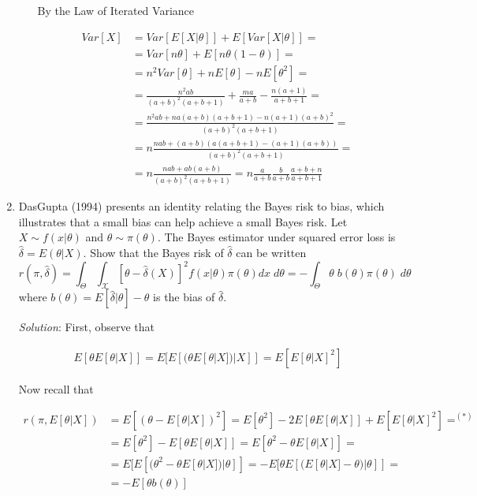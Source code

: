 \documentclass[11pt]{article}
\begin{document}
\begin{enumerate}
\begin{enumerate}
By the Law of Iterated Variance

\begin{align*}
Var[X]	&= Var[E[X|\theta]] + E[Var[X|\theta]] = \\
				&= Var[n\theta] + E[n\theta(1-\theta)] = \\
				&= n^{2}Var[\theta] + nE[\theta] - nE[\theta^{2}] = \\
				&= \frac{n^{2}ab}{(a+b)^{2}(a+b+1)} + \frac{ma}{a+b} - \frac{n(a+1)}{a+b+1} = \\
				&= \frac{n^{2}ab +na(a+b)(a+b+1) - n(a+1)(a+b)^{2}}{(a+b)^{2}(a+b+1)} = \\
				&= n\frac{nab +(a+b)(a(a+b+1)-(a+1)(a+b))}{(a+b)^{2}(a+b+1)} = \\
				&= n\frac{nab + ab(a+b)}{(a+b)^{2}(a+b+1)} = n\frac{a}{a+b}\frac{b}{a+b}\frac{a+b+n}{a+b+1}
\end{align*}

\end{enumerate}

\item DasGupta (1994) presents an identity relating the Bayes risk to bias, which illustrates that a small bias can help achieve a small Bayes risk. Let $X \sim f(x|\theta)$ and $\theta \sim \pi(\theta).$ The Bayes estimator under squared error loss is 
$\hat{\delta} = E(\theta|X).$ Show that the Bayes risk of $\hat{\delta}$ can be written 
$$r(\pi,\hat{\delta} ) 
= \int_{\Theta} \int_{\mathcal{X}} 
[\theta - \hat{\delta}(X)]^2 f(x|\theta) \pi(\theta) dx \; d\theta =
- \int_{\Theta} \theta\; b(\theta) \pi(\theta)\; d\theta$$
where $b(\theta) = E[\hat{\delta} | \theta] - \theta$ is the bias of $\hat{\delta} .$

\emph{Solution}: First, observe that

\begin{align}
	\label{eqn4.1}
	E[\theta E[\theta|X]] = E[E[(\theta E[\theta|X])|X]] = E[E[\theta|X]^{2}]
\end{align}

Now recall that

\begin{align*}
	r(\pi,E[\theta|X])	&= E[(\theta-E[\theta|X])^{2}] = E[\theta^{2}] -2E[\theta E[\theta|X]] + E[E[\theta|X]^{2}] =^{(*)} \\
											&= E[\theta^{2}] - E[\theta E[\theta|X]] = E[\theta^{2}-\theta E[\theta|X]] = \\
											&= E[E[(\theta^{2} - \theta E[\theta|X])|\theta]] = -E[\theta E[(E[\theta|X]-\theta)|\theta]] = \\
											&= -E[\theta b(\theta)]
\end{align*}


\end{enumerate}
\end{document}
